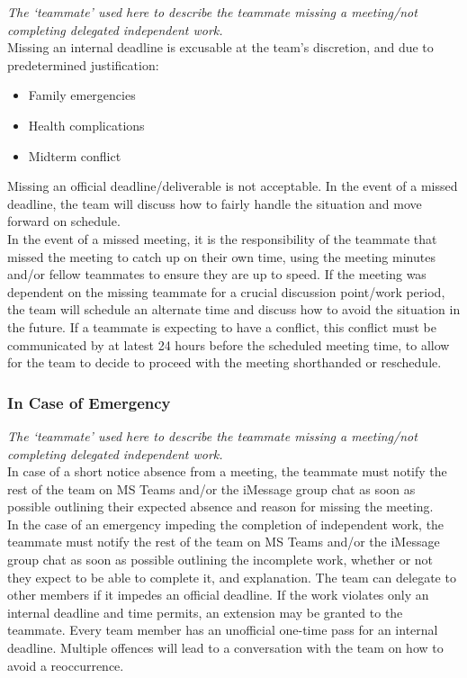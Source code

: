 \documentclass{article}
\begin{document}
\textit{The ‘teammate’ used here to describe the teammate missing a meeting/not completing delegated independent work.} \\

Missing an internal deadline is excusable at the team’s discretion, and due to predetermined justification: 
\begin{itemize}
    \item Family emergencies 
    \item Health complications 
    \item Midterm conflict  \\
\end{itemize} 

Missing an official deadline/deliverable is not acceptable. In the event of a missed deadline, the team will discuss how to fairly handle the situation and move forward on schedule.  \\

In the event of a missed meeting, it is the responsibility of the teammate that missed the meeting to catch up on their own time, using the meeting minutes and/or fellow teammates to ensure they are up to speed. If the meeting was dependent on the missing teammate for a crucial discussion point/work period, the team will schedule an alternate time and 	discuss how to avoid the situation in the future. If a teammate is expecting to have a conflict, this conflict must be communicated by at latest 24 hours before the scheduled meeting time, to allow for the team to decide to proceed with the meeting shorthanded or reschedule. \\

\subsubsection*{In Case of Emergency}

\textit{The ‘teammate’ used here to describe the teammate missing a meeting/not completing delegated independent work.} \\
 
In case of a short notice absence from a meeting, the teammate must notify the rest of the team on MS Teams and/or the iMessage group chat as soon as possible outlining their expected absence and reason for missing the meeting.  \\

In the case of an emergency impeding the completion of independent work, the teammate must notify the rest of the team on MS Teams and/or the iMessage group chat as soon as possible outlining the incomplete work, whether or not they expect to be able to complete it, and explanation. The team can delegate to other members if it impedes an official deadline. If the work violates only an internal deadline and time permits, an extension may be granted to the teammate. Every team member has an unofficial one-time pass for an internal deadline. Multiple offences will lead to a conversation with the team on how to avoid a reoccurrence. 
\end{document}
